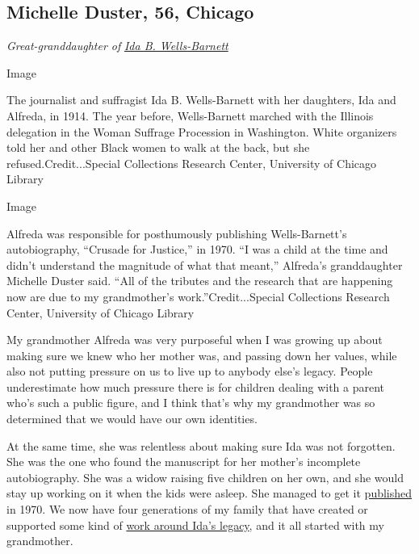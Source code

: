 \hypertarget{michelle-duster-56-chicago}{%
\subsection{Michelle Duster, 56,
Chicago}\label{michelle-duster-56-chicago}}

\emph{Great-granddaughter of}
\href{https://www.nytimes.com/interactive/2018/obituaries/overlooked-ida-b-wells.html}{\emph{Ida
B. Wells-Barnett}}

Image

The journalist and suffragist Ida B. Wells-Barnett with her daughters,
Ida and Alfreda, in 1914. The year before, Wells-Barnett marched with
the Illinois delegation in the Woman Suffrage Procession in Washington.
White organizers told her and other Black women to walk at the back, but
she refused.Credit...Special Collections Research Center, University of
Chicago Library

Image

Alfreda was responsible for posthumously publishing Wells-Barnett's
autobiography, ``Crusade for Justice,'' in 1970. ``I was a child at the
time and didn't understand the magnitude of what that meant,'' Alfreda's
granddaughter Michelle Duster said. ``All of the tributes and the
research that are happening now are due to my grandmother's
work.''Credit...Special Collections Research Center, University of
Chicago Library

My grandmother Alfreda was very purposeful when I was growing up about
making sure we knew who her mother was, and passing down her values,
while also not putting pressure on us to live up to anybody else's
legacy. People underestimate how much pressure there is for children
dealing with a parent who's such a public figure, and I think that's why
my grandmother was so determined that we would have our own identities.

At the same time, she was relentless about making sure Ida was not
forgotten. She was the one who found the manuscript for her mother's
incomplete autobiography. She was a widow raising five children on her
own, and she would stay up working on it when the kids were asleep. She
managed to get it
\href{https://press.uchicago.edu/ucp/books/book/chicago/C/bo49856620.html}{published}
in 1970. We now have four generations of my family that have created or
supported some kind of
\href{https://www.simonandschuster.com/books/Ida-B-the-Queen/Michelle-Duster/9781982129811}{work
around Ida's legacy}, and it all started with my grandmother.

